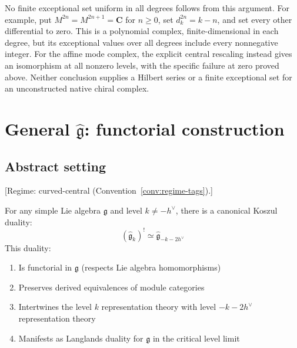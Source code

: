 \begin{remark}
\label{rem:special-level-values}
No finite exceptional set uniform in all degrees follows from this argument.
For example, put $M^{2n}=M^{2n+1}=\mathbf C$ for $n\ge0$, set
$d_k^{2n}=k-n$, and set every other differential to zero.
This is a polynomial complex, finite-dimensional in each degree, but its
exceptional values over all degrees include every nonnegative integer.
For the affine mode complex, the explicit central rescaling instead gives
an isomorphism at all nonzero levels, with the specific failure at zero
proved above.  Neither conclusion supplies a Hilbert series or a finite
exceptional set for an unconstructed native chiral complex.
\end{remark}


\section{\texorpdfstring{General $\widehat{\mathfrak{g}}$: functorial construction}{General g: functorial construction}}

\subsection{Abstract setting}

\begin{theorem}\label{thm:universal-kac-moody-koszul}
\textup{[Regime: curved-central
\textup{(}Convention~\textup{\ref{conv:regime-tags})}.]}

For any simple Lie algebra $\mathfrak{g}$ and level $k \neq -h^\vee$, there is a canonical Koszul duality:
\begin{equation}
(\widehat{\mathfrak{g}}_k)^! \simeq \widehat{\mathfrak{g}}_{-k-2h^\vee}
\end{equation}
This duality:
\begin{enumerate}
\item Is functorial in $\mathfrak{g}$ (respects Lie algebra homomorphisms)
\item Preserves derived equivalences of module categories
\item Intertwines the level $k$ representation theory with level $-k-2h^\vee$ representation theory
\item Manifests as Langlands duality for $\mathfrak{g}$ in the critical level limit
\end{enumerate}
\end{theorem}

